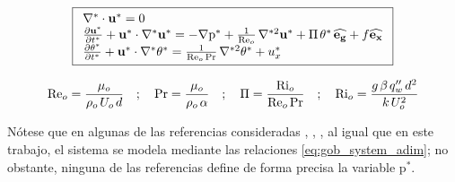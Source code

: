 

\begin{equation}
\boxed{
\begin{array}{l}
    \nabla^* \cdot \mathbf{u^*} = 0 \\
    \frac{\partial \mathbf{u^*}}{\partial t^*} + \mathbf{u^*} \cdot \nabla^* \mathbf{u^*} = 
    -\nabla \text{p}^* + \frac{1}{\text{Re}_o} \hspace{0.5mm} \nabla^{*2} \mathbf{u^*} + \Pi \hspace{0.5mm} \theta^* \hspace{0.5mm} \mathbf{\widehat{e_g}} + f \mathbf{\widehat{e_x}}  \\
    \frac{\partial \theta^*}{\partial t^*} + \mathbf{u^*} \cdot \nabla^* \theta^* = 
    \frac{1}{\text{Re}_o \hspace{0.5mm} \text{Pr}} \hspace{0.5mm} \nabla^{*2} \theta^* + u_x^* 
\end{array}
}
\label{eq:gob_system_adim}
\end{equation}

\begin{equation}
\text{Re}_o = \frac{\mu_o}{\rho_o \hspace{0.5mm} U_o \hspace{0.5mm} d } \quad ; \quad \text{Pr}= \frac{\mu_o}{\rho_o \hspace{0.5mm} \alpha} \quad ; \quad \Pi = \frac{\text{Ri}_o}{\text{Re}_o \hspace{0.5mm} \text{Pr}} \quad ; \quad \text{Ri}_o = \frac{g \hspace{0.5mm} \beta \hspace{0.5mm} q''_w \hspace{0.5mm} d^2}{k \hspace{0.5mm} U_o^2}
\label{eq:num_adim}
\end{equation}

Nótese que en algunas de las referencias consideradas \cite{guo2022direct}, \cite{zhou2024direct}, \cite{tao1960}, al igual que en este trabajo, el sistema se modela mediante las relaciones \ref{eq:gob_system_adim}; no obstante, ninguna de las referencias define de forma precisa la variable $\text{p}^*$.

